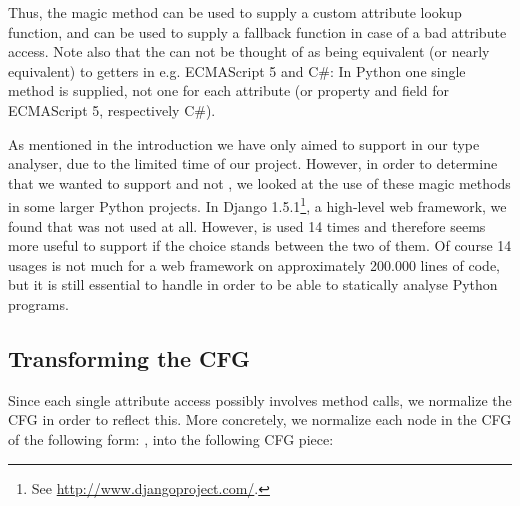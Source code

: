 Thus, the magic method  can be used to supply a custom attribute lookup function, and  can be used to supply a fallback function in case of a bad attribute access. Note also that the  can not be thought of as being equivalent (or nearly equivalent) to getters in e.g. ECMAScript 5 and C\#: In Python one single method is supplied, not one for each attribute (or property and field for ECMAScript 5, respectively C\#).

As mentioned in the introduction we have only aimed to support  in our type analyser, due to the limited time of our project. However, in order to determine that we wanted to support  and not , we looked at the use of these magic methods in some larger Python projects. In Django 1.5.1\footnote{See \url{http://www.djangoproject.com/}.}, a high-level web framework, we found that  was not used at all. However,  is used 14 times and therefore seems more useful to support if the choice stands between the two of them. Of course 14 usages is not much for a web framework on approximately 200.000 lines of code, but it is still essential to handle in order to be able to statically analyse Python programs.

\subsection{Transforming the CFG}
\label{Magic methods transformation}
Since each single attribute access possibly involves method calls, we normalize the CFG in order to reflect this. More concretely, we normalize each node in the CFG of the following form: , into the following CFG piece:

